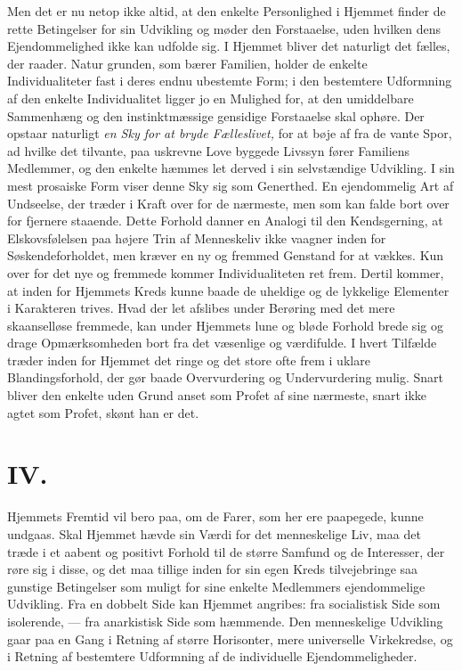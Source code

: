 \documentclass[12pt,a4paper]{article}
\newcommand{\opage}[1]{\marginnote{\footnotesize\textit{[#1]}}}
\begin{document}
Men det er nu netop ikke altid, at den enkelte Personlighed i Hjemmet finder
de rette Betingelser for sin Udvikling og møder den Forstaae\-lse, uden
hvilken dens Ejendommelighed ikke kan udfolde sig. I Hjemmet bliver det
naturligt det fælles, der raader. Natur%
\opage{10}grunden, som bærer Familien, holder de
enkelte Individualiteter fast i deres endnu ubestemte Form; i den bestemtere
Udformning af den enkelte Individualitet ligger jo en Mulighed for, at den
umiddelbare Sammenhæng og den instinktmæssige gensidige Forstaae\-lse skal
ophøre. Der opstaar naturligt \emph{en Sky for at bryde Fælleslivet,} for at bøje af
fra de vante Spor, ad hvilke det tilvante, paa uskrevne Love byggede Livssyn
fører Familiens Medlemmer, og den enkelte hæmmes let derved i sin selvstændige
Udvikling. I sin mest prosaiske Form viser denne Sky sig som Generthed. En
ejendommelig Art af Undseelse, der træder i Kraft over for de nærmeste, men
som kan falde bort over for fjernere staaende. Dette Forhold danner en Analogi
til den Kendsgerning, at Elskovsfølelsen paa højere Trin af Menneskeliv ikke
vaagner inden for Søskendeforholdet, men kræver en ny og fremmed Genstand for
at vækkes. Kun over for det nye og fremmede kommer Individualiteten ret frem.
Dertil kommer, at inden for Hjemmets Kreds kunne baade de uheldige og de
lykkelige Elementer i Karakteren trives. Hvad der let afslibes under Berøring
med det mere skaanselløse fremmede, kan under Hjemmets lune og bløde Forhold
brede sig og drage Opmærksomheden bort fra det væsenlige og værdifulde. I
hvert Tilfælde træder inden for Hjemmet det ringe og det store ofte frem i
uklare Blandingsforhold, der gør baade Overvurdering og Undervurdering mulig.
Snart bliver den enkelte uden Grund anset som Profet af sine nærmeste, snart
ikke agtet som Profet, skønt han er det.

\section*{IV.}

\noindent Hjemmets Fremtid vil bero paa, om de Farer, som her ere paapegede, kunne undgaas. Skal Hjemmet hævde sin Værdi for det
menneskelige Liv, maa det træde i et aabent og positivt Forhold til de større
Samfund og de Interesser, der røre sig i disse, og det maa tillige inden for
sin egen Kreds tilvejebringe saa gunstige Betingelser som muligt for sine
enkelte Medlemmers ejendommelige Udvikling. Fra en dobbelt Side kan Hjemmet
angribes: fra socialistisk Side som isolerende, --- fra anarkistisk Side som
hæmmende. Den menneskelige Udvikling gaar paa en Gang i Retning af større
Horisonter, mere universelle Virkekredse, og i Retning af bestemtere
Udformning af de individuelle Ejendommeligheder.
\end{document}
